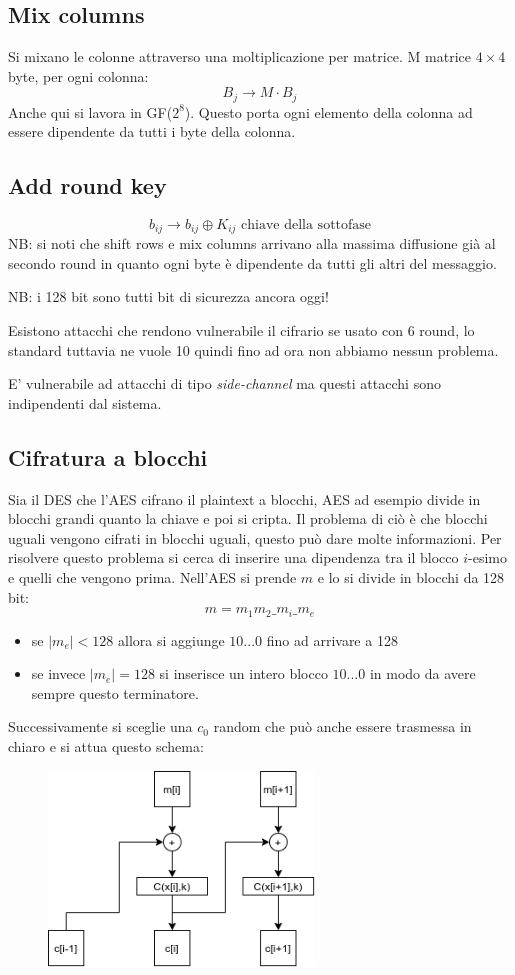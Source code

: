 \subsection{Mix columns}
Si mixano le colonne attraverso una moltiplicazione per matrice.
M matrice $4 \times 4$ byte, per ogni colonna:
$$
    B_{j} \xrightarrow{} M \cdot B_{j}
$$
Anche qui si lavora in GF($2^8$). Questo porta ogni elemento della colonna ad essere dipendente da tutti i byte della colonna.

\subsection{Add round key}
$$
    b_{ij} \xrightarrow{} b_{ij} \oplus K_{ij} \text{ chiave della sottofase}
$$
NB: si noti che shift rows e mix columns arrivano alla massima diffusione già al secondo round in quanto ogni byte è dipendente da tutti gli altri del messaggio.

NB: i 128 bit sono tutti bit di sicurezza ancora oggi!

Esistono attacchi che rendono vulnerabile il cifrario se usato con 6 round, lo standard tuttavia ne vuole 10 quindi fino ad ora non abbiamo nessun problema.

E' vulnerabile ad attacchi di tipo \emph{side-channel} ma questi attacchi sono indipendenti dal sistema.

\subsection{Cifratura a blocchi}
Sia il DES che l'AES cifrano il plaintext a blocchi, AES ad esempio divide in blocchi grandi quanto la chiave e poi si cripta.
Il problema di ciò è che blocchi uguali vengono cifrati in blocchi uguali, questo può dare molte informazioni.
Per risolvere questo problema si cerca di inserire una dipendenza tra il blocco $i$-esimo e quelli che vengono prima.
Nell'AES si prende $m$ e lo si divide in blocchi da 128 bit:
$$ m = m_{1}m_{2}\_m_{i}\_m_{e} $$
\begin{itemize}
    \item se $\mid m_e \mid < 128$ allora si aggiunge $10...0$ fino ad arrivare a 128
    \item se invece $ \mid m_e \mid = 128 $ si inserisce un intero blocco $10...0$ in modo da avere sempre questo terminatore.
\end{itemize}
Successivamente si sceglie una $c_0$ random che può anche essere trasmessa in chiaro e si attua questo schema:
\begin{figure}[H]
    \centering
    \includegraphics[width = 200pt]{CBC.png}
\end{figure}

